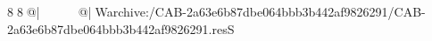 8  8  @|                                                   @| W   archive:/CAB-2a63e6b87dbe064bbb3b442af9826291/CAB-2a63e6b87dbe064bbb3b442af9826291.resS 